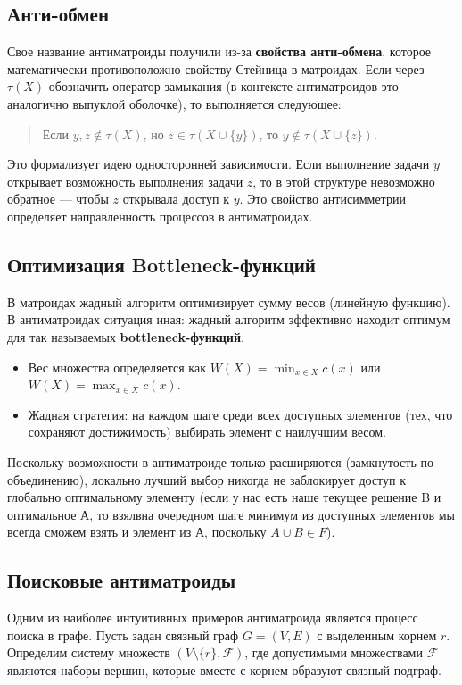 \subsection{Анти-обмен}

Свое название антиматроиды получили из-за \textbf{свойства анти-обмена}, которое математически противоположно свойству Стейница в матроидах. Если через $\tau(X)$ обозначить оператор замыкания (в контексте антиматроидов это аналогично выпуклой оболочке), то выполняется следующее:
\begin{quote}
    Если $y, z \notin \tau(X)$, но $z \in \tau(X \cup \{y\})$, то $y \notin \tau(X \cup \{z\})$.
\end{quote}
Это формализует идею односторонней зависимости. Если выполнение задачи $y$ открывает возможность выполнения задачи $z$, то в этой структуре невозможно обратное — чтобы $z$ открывала доступ к $y$. Это свойство антисимметрии определяет направленность процессов в антиматроидах.

\subsection{Оптимизация Bottleneck-функций}

В матроидах жадный алгоритм оптимизирует сумму весов (линейную функцию). В антиматроидах ситуация иная: жадный алгоритм эффективно находит оптимум для так называемых \textbf{bottleneck-функций}.
\begin{itemize}
    \item Вес множества определяется как $W(X) = \min_{x \in X} c(x)$ или $W(X) = \max_{x \in X} c(x)$.
    \item Жадная стратегия: на каждом шаге среди всех доступных элементов (тех, что сохраняют достижимость) выбирать элемент с наилучшим весом.
\end{itemize}
Поскольку возможности в антиматроиде только расширяются (замкнутость по объединению), локально лучший выбор никогда не заблокирует доступ к глобально оптимальному элементу (если у нас есть наше текущее решение B и оптимальное А, то взялвна очередном шаге минимум из доступных элементов мы всегда сможем взять и элемент из А, поскольку $A \cup B \in F$).

\subsection{Поисковые антиматроиды}

Одним из наиболее интуитивных примеров антиматроида является процесс поиска в графе. Пусть задан связный граф $G=(V, E)$ с выделенным корнем $r$. Определим систему множеств $(V \setminus \{r\}, \mathcal{F})$, где допустимыми множествами $\mathcal{F}$ являются наборы вершин, которые вместе с корнем образуют связный подграф.

